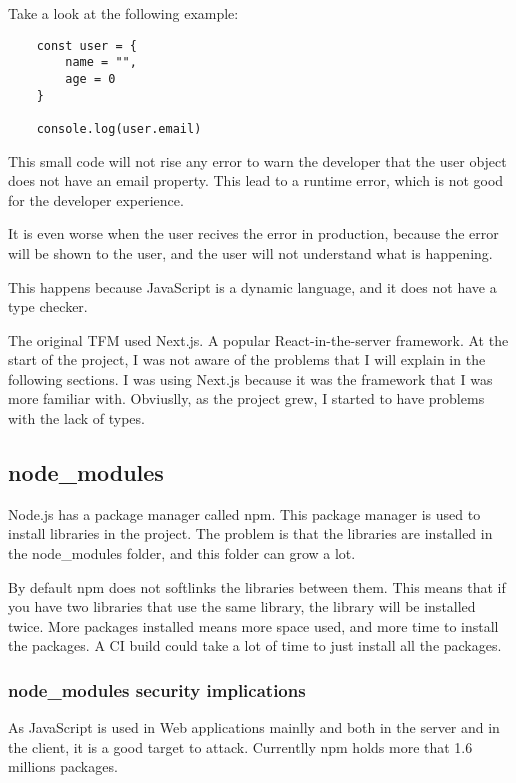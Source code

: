 \documentclass[12pt, letterpaper]{article}
\begin{document}
\begin{multicols}{2}
    Take a look at the following example:
    \begin{lstlisting}
    const user = {
        name = "",
        age = 0
    }

    console.log(user.email)
    \end{lstlisting}

    This small code will not rise any error to warn the developer that the user object does not have an email property. This lead to a runtime error, which is not good for the developer experience.

    It is even worse when the user recives the error in production, because the error will be shown to the user, and the user will not understand what is happening.

    This happens because JavaScript is a dynamic language, and it does not have a type checker.

    The original TFM used Next.js. A popular React-in-the-server framework. At the start of the project, I was not aware of the problems that I will explain in the following sections. I was using Next.js because it was the framework that I was more familiar with. Obviuslly, as the project grew, I started to have problems with the lack of types.

    \subsection{node\_modules}

    Node.js has a package manager called npm. This package manager is used to install libraries in the project. The problem is that the libraries are installed in the node\_modules folder, and this folder can grow a lot.

    By default npm does not softlinks the libraries between them. This means that if you have two libraries that use the same library, the library will be installed twice. More packages installed means more space used, and more time to install the packages. A CI build could take a lot of time to just install all the packages.

    \subsubsection{node\_modules security implications}

    As JavaScript is used in Web applications mainlly and both in the server and in the client, it is a good target to attack. Currentlly npm holds more that 1.6 millions packages.


\end{multicols}
\end{document}
